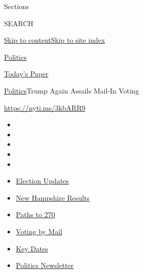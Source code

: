 Sections

SEARCH

\protect\hyperlink{site-content}{Skip to
content}\protect\hyperlink{site-index}{Skip to site index}

\href{https://www.nytimes3xbfgragh.onion/section/politics}{Politics}

\href{https://myaccount.nytimes3xbfgragh.onion/auth/login?response_type=cookie\&client_id=vi}{}

\href{https://www.nytimes3xbfgragh.onion/section/todayspaper}{Today's
Paper}

\href{/section/politics}{Politics}\textbar{}Trump Again Assails Mail-In
Voting

\url{https://nyti.ms/3kbARR9}

\begin{itemize}
\item
\item
\item
\item
\item
\end{itemize}

\begin{itemize}
\item
  \href{https://www.nytimes3xbfgragh.onion/live/2020/09/09/us/trump-vs-biden?action=click\&pgtype=Article\&state=default\&region=TOP_BANNER\&context=storylines_menu}{Election
  Updates}
\item
  \href{https://www.nytimes3xbfgragh.onion/interactive/2020/09/08/us/elections/results-new-hampshire-primary-elections.html?action=click\&pgtype=Article\&state=default\&region=TOP_BANNER\&context=storylines_menu}{New
  Hampshire Results}
\item
  \href{https://www.nytimes3xbfgragh.onion/interactive/2020/us/elections/election-states-biden-trump.html?action=click\&pgtype=Article\&state=default\&region=TOP_BANNER\&context=storylines_menu}{Paths
  to 270}
\item
  \href{https://www.nytimes3xbfgragh.onion/interactive/2020/08/31/us/politics/vote-by-mail-deadlines.html?action=click\&pgtype=Article\&state=default\&region=TOP_BANNER\&context=storylines_menu}{Voting
  by Mail}
\item
  \href{https://www.nytimes3xbfgragh.onion/interactive/2019/us/elections/2020-presidential-election-calendar.html?action=click\&pgtype=Article\&state=default\&region=TOP_BANNER\&context=storylines_menu}{Key
  Dates}
\item
  \href{https://www.nytimes3xbfgragh.onion/newsletters/politics?action=click\&pgtype=Article\&state=default\&region=TOP_BANNER\&context=storylines_menu}{Politics
  Newsletter}
\end{itemize}

